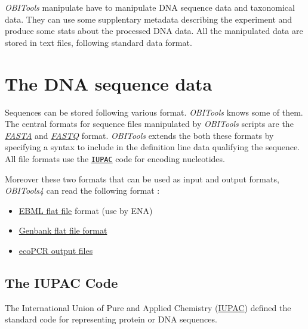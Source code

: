 \documentclass[
  letterpaper,
  DIV=11,
  numbers=noendperiod]{scrreprt}
\providecommand{\tightlist}{%
  \setlength{\itemsep}{0pt}\setlength{\parskip}{0pt}}\usepackage{longtable,booktabs,array}
\begin{document}
\emph{OBITools} manipulate have to manipulate DNA sequence data and
taxonomical data. They can use some supplentary metadata describing the
experiment and produce some stats about the processed DNA data. All the
manipulated data are stored in text files, following standard data
format.

\hypertarget{the-dna-sequence-data}{%
\section{The DNA sequence data}\label{the-dna-sequence-data}}

Sequences can be stored following various format. \emph{OBITools} knows
some of them. The central formats for sequence files manipulated by
\emph{OBITools} scripts are the
\protect\hyperlink{sec-fasta}{\emph{FASTA}} and
\protect\hyperlink{sec-fastq}{\emph{FASTQ}} format. \emph{OBITools}
extends the both these formats by specifying a syntax to include in the
definition line data qualifying the sequence. All file formats use the
\protect\hyperlink{sec-iupac}{\texttt{IUPAC}} code for encoding
nucleotides.

Moreover these two formats that can be used as input and output formats,
\emph{OBITools4} can read the following format :

\begin{itemize}
\tightlist
\item
  \href{https://ena-docs.readthedocs.io/en/latest/submit/fileprep/flat-file-example.html}{EBML
  flat file} format (use by ENA)
\item
  \href{https://www.ncbi.nlm.nih.gov/Sitemap/samplerecord.html}{Genbank
  flat file format}
\item
  \href{https://pythonhosted.org/OBITools/scripts/ecoPCR.html}{ecoPCR
  output files}
\end{itemize}

\hypertarget{sec-iupac}{%
\subsection{The IUPAC Code}\label{sec-iupac}}

The International Union of Pure and Applied Chemistry (\href{}{IUPAC})
defined the standard code for representing protein or DNA sequences.
\end{document}

